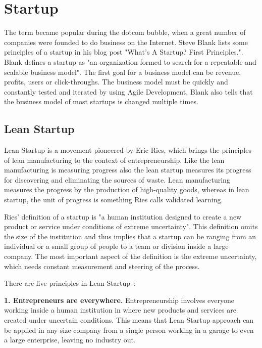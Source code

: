 
 \section{Startup}

The term became popular during the dotcom bubble, when a great number of companies were founded to do business on the Internet. Steve Blank lists some principles of a startup in his blog post "What’s A Startup? First Principles.". Blank defines a startup as "an organization formed to search for a repeatable and scalable business model". The first goal for a business model can be revenue, profits, users or click-throughs. The business model must be quickly and constantly tested and iterated by using Agile Development. Blank also tells that the business model of most startups is changed multiple times.~\cite{blank2010startup}

 \subsection{Lean Startup}
 
Lean Startup is a movement pioneered by Eric Ries, which brings the principles of lean manufacturing to the context of entrepreneurship. Like the lean manufacturing is measuring progress also the lean startup measures its progress for discovering and eliminating the sources of waste. Lean manufacturing measures the progress by the production of high-quality goods, whereas in lean startup, the unit of progress is something Ries calls validated learning.~\cite{ries2011lean}

Ries' definition of a startup is "a human institution designed to create a new product or service under conditions of extreme uncertainty". This definition omits the size of the institution and thus implies that a startup can be ranging from an individual or a small group of people to a team or division inside a large company. The most important aspect of the definition is the extreme uncertainty, which needs constant measurement and steering of the process.

There are five principles in Lean Startup~\cite{ries2011lean}:


\textbf{1. Entrepreneurs are everywhere.} Entrepreneurship involves everyone working inside a human institution in where new products and services are created under uncertain conditions. This means that Lean Startup approach can be applied in any size company from a single person working in a garage to even a large enterprise, leaving no industry out.


